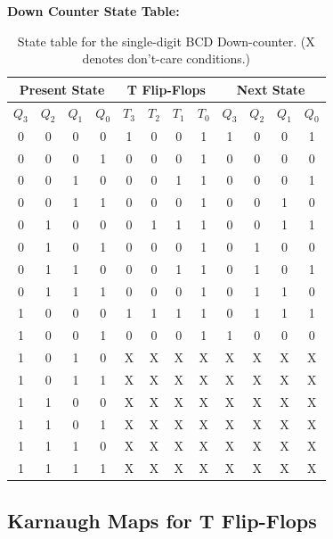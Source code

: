 \documentclass[a4paper,12pt]{article}
\begin{document}
\vspace{0.5cm}
\textbf{Down Counter State Table:}
\begin{table}[h]
\centering
\begin{tabular}{|c|c|c|c||c|c|c|c||c|c|c|c|}
\hline
\multicolumn{4}{|c||}{Present State} & \multicolumn{4}{c||}{T Flip-Flops} & \multicolumn{4}{c|}{Next State} \\
\hline
\(Q_3\) & \(Q_2\) & \(Q_1\) & \(Q_0\) & \(T_3\) & \(T_2\) & \(T_1\) & \(T_0\) & \(Q_3\) & \(Q_2\) & \(Q_1\) & \(Q_0\) \\
\hline
0 & 0 & 0 & 0 & 1 & 0 & 0 & 1 & 1 & 0 & 0 & 1 \\
\hline
0 & 0 & 0 & 1 & 0 & 0 & 0 & 1 & 0 & 0 & 0 & 0 \\
\hline
0 & 0 & 1 & 0 & 0 & 0 & 1 & 1 & 0 & 0 & 0 & 1 \\
\hline
0 & 0 & 1 & 1 & 0 & 0 & 0 & 1 & 0 & 0 & 1 & 0 \\
\hline
0 & 1 & 0 & 0 & 0 & 1 & 1 & 1 & 0 & 0 & 1 & 1 \\
\hline
0 & 1 & 0 & 1 & 0 & 0 & 0 & 1 & 0 & 1 & 0 & 0 \\
\hline
0 & 1 & 1 & 0 & 0 & 0 & 1 & 1 & 0 & 1 & 0 & 1 \\
\hline
0 & 1 & 1 & 1 & 0 & 0 & 0 & 1 & 0 & 1 & 1 & 0 \\
\hline
1 & 0 & 0 & 0 & 1 & 1 & 1 & 1 & 0 & 1 & 1 & 1 \\
\hline
1 & 0 & 0 & 1 & 0 & 0 & 0 & 1 & 1 & 0 & 0 & 0 \\
\hline
1 & 0 & 1 & 0 & X & X & X & X & X & X & X & X \\
\hline
1 & 0 & 1 & 1 & X & X & X & X & X & X & X & X \\
\hline
1 & 1 & 0 & 0 & X & X & X & X & X & X & X & X \\
\hline
1 & 1 & 0 & 1 & X & X & X & X & X & X & X & X \\
\hline
1 & 1 & 1 & 0 & X & X & X & X & X & X & X & X \\
\hline
1 & 1 & 1 & 1 & X & X & X & X & X & X & X & X \\
\hline
\end{tabular}
\caption{State table for the single-digit BCD Down-counter. (X denotes don't-care conditions.)}
\end{table}

\newpage
\subsection*{Karnaugh Maps for T Flip-Flops}
\end{document}
